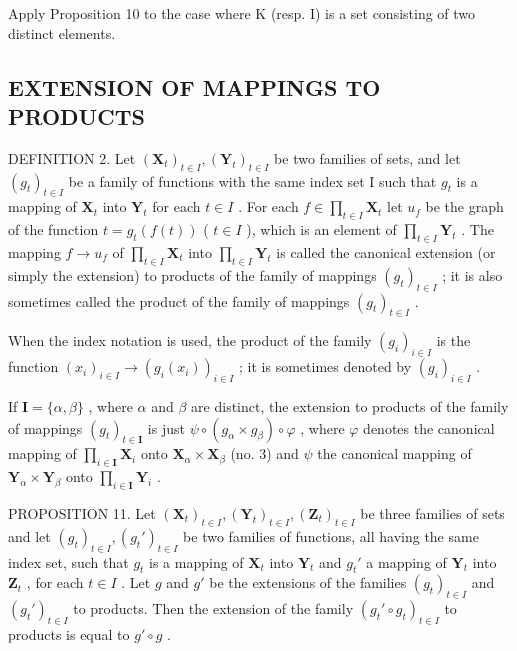 Apply Proposition 10 to the case where K (resp. I) is a set consisting of two distinct elements.

\subsection{EXTENSION OF MAPPINGS TO PRODUCTS}

DEFINITION 2. Let \((\mathbf{X}_t)_{t \in I}, (\mathbf{Y}_t)_{t \in I}\) be two families of sets, and let \((g_t)_{t \in I}\) be a family of functions with the same index set I such that \(g_t\) is a mapping of \(\mathbf{X}_t\) into \(\mathbf{Y}_t\) for each \(t \in I\) . For each \(f \in \prod_{t \in I} \mathbf{X}_t\) let \(u_f\) be the graph of the function \(t = g_t(f(t))\) ( \(t \in I\) ), which is an element of \(\prod_{t \in I} \mathbf{Y}_t\) . The mapping \(f \to u_f\) of \(\prod_{t \in I} \mathbf{X}_t\) into \(\prod_{t \in I} \mathbf{Y}_t\) is called the canonical extension (or simply the extension) to products of the family of mappings \((g_t)_{t \in I}\) ; it is also sometimes called the product of the family of mappings \((g_t)_{t \in I}\) .

When the index notation is used, the product of the family \((g_{i})_{i\in I}\) is the function \((x_{i})_{i\in I}\to (g_{i}(x_{i}))_{i\in I}\) ; it is sometimes denoted by \((g_{i})_{i\in I}\) .

If \(\mathbf{I} = \{\alpha, \beta\}\) , where \(\alpha\) and \(\beta\) are distinct, the extension to products of the family of mappings \((g_t)_{t \in \mathbf{I}}\) is just \(\psi \circ (g_\alpha \times g_\beta) \circ \varphi\) , where \(\varphi\) denotes the canonical mapping of \(\prod_{i \in \mathbf{I}} \mathbf{X}_i\) onto \(\mathbf{X}_\alpha \times \mathbf{X}_\beta\) (no. 3) and \(\psi\) the canonical mapping of \(\mathbf{Y}_\alpha \times \mathbf{Y}_\beta\) onto \(\prod_{i \in \mathbf{I}} \mathbf{Y}_i\) .

PROPOSITION 11. Let \((\mathbf{X}_t)_{t \in I}, (\mathbf{Y}_t)_{t \in I}, (\mathbf{Z}_t)_{t \in I}\) be three families of sets and let \((g_t)_{t \in I}, (g_t')_{t \in I}\) be two families of functions, all having the same index set, such that \(g_t\) is a mapping of \(\mathbf{X}_t\) into \(\mathbf{Y}_t\) and \(g_t'\) a mapping of \(\mathbf{Y}_t\) into \(\mathbf{Z}_t\) , for each \(t \in I\) . Let \(g\) and \(g'\) be the extensions of the families \((g_t)_{t \in I}\) and \((g_t')_{t \in I}\) to products. Then the extension of the family \((g_t' \circ g_t)_{t \in I}\) to products is equal to \(g'\circ g\) .

